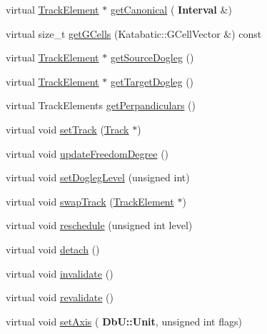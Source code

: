 \begin{DoxyCompactItemize}
\item 
virtual \mbox{\hyperlink{classKite_1_1TrackElement}{Track\+Element}} $\ast$ \mbox{\hyperlink{classKite_1_1TrackSegment_af2d46d64cbd02bdbba53d5483d95e26d}{get\+Canonical}} (\textbf{ Interval} \&)
\item 
virtual size\+\_\+t \mbox{\hyperlink{classKite_1_1TrackSegment_af45301f76558f613ccb605a8f851080e}{get\+G\+Cells}} (Katabatic\+::\+G\+Cell\+Vector \&) const
\item 
virtual \mbox{\hyperlink{classKite_1_1TrackElement}{Track\+Element}} $\ast$ \mbox{\hyperlink{classKite_1_1TrackSegment_a7e79fbfe77f173d46b1959c41087930a}{get\+Source\+Dogleg}} ()
\item 
virtual \mbox{\hyperlink{classKite_1_1TrackElement}{Track\+Element}} $\ast$ \mbox{\hyperlink{classKite_1_1TrackSegment_aeb4e39bd925d093e6c45599433bb421c}{get\+Target\+Dogleg}} ()
\item 
virtual Track\+Elements \mbox{\hyperlink{classKite_1_1TrackSegment_aa0ba92ebf19f596537dc051c090d5736}{get\+Perpandiculars}} ()
\item 
virtual void \mbox{\hyperlink{classKite_1_1TrackSegment_abd3d8093f871d3d1a7f24b053648026c}{set\+Track}} (\mbox{\hyperlink{classKite_1_1Track}{Track}} $\ast$)
\item 
virtual void \mbox{\hyperlink{classKite_1_1TrackSegment_af5332d647c0482aa90ad7cc9b2a50f3a}{update\+Freedom\+Degree}} ()
\item 
virtual void \mbox{\hyperlink{classKite_1_1TrackSegment_a2b90319cb042b283aa5d1fdb1992f11f}{set\+Dogleg\+Level}} (unsigned int)
\item 
virtual void \mbox{\hyperlink{classKite_1_1TrackSegment_acc245ce084989d1c34816d0e61b9d510}{swap\+Track}} (\mbox{\hyperlink{classKite_1_1TrackElement}{Track\+Element}} $\ast$)
\item 
virtual void \mbox{\hyperlink{classKite_1_1TrackSegment_a0ffe603ec7d46f21f5e56ccbe84c03fb}{reschedule}} (unsigned int level)
\item 
virtual void \mbox{\hyperlink{classKite_1_1TrackSegment_ac295bade8aee589f6718dfa79edc2a34}{detach}} ()
\item 
virtual void \mbox{\hyperlink{classKite_1_1TrackSegment_a893f1101c650c08c98612515c2b1a89c}{invalidate}} ()
\item 
virtual void \mbox{\hyperlink{classKite_1_1TrackSegment_a5bd93abe1416952ace15a98dbeeed124}{revalidate}} ()
\item 
virtual void \mbox{\hyperlink{classKite_1_1TrackSegment_a262a915c38127d3722ec561b30d80f91}{set\+Axis}} (\textbf{ Db\+U\+::\+Unit}, unsigned int flags)

\end{DoxyCompactItemize}
